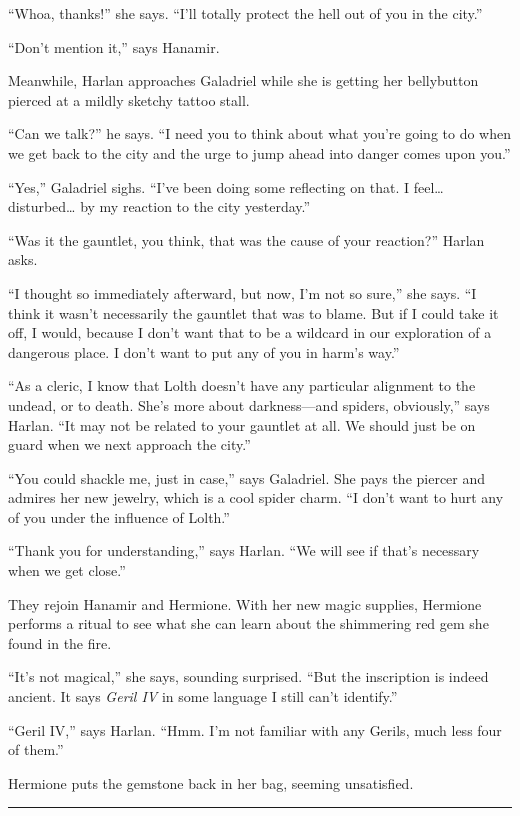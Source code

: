 \documentclass[smalldemyvopaper,11pt,twoside,onecolumn,openright,extrafontsizes]{memoir}
\begin{document}
``Whoa, thanks!'' she says. ``I'll totally protect the hell out of you
in the city.''

``Don't mention it,'' says Hanamir.

Meanwhile, Harlan approaches Galadriel while she is getting her
bellybutton pierced at a mildly sketchy tattoo stall.

``Can we talk?'' he says. ``I need you to think about what you're going
to do when we get back to the city and the urge to jump ahead into
danger comes upon you.''

``Yes,'' Galadriel sighs. ``I've been doing some reflecting on that. I
feel\ldots{} disturbed\ldots{} by my reaction to the city yesterday.''

``Was it the gauntlet, you think, that was the cause of your reaction?''
Harlan asks.

``I thought so immediately afterward, but now, I'm not so sure,'' she
says. ``I think it wasn't necessarily the gauntlet that was to blame.
But if I could take it off, I would, because I don't want that to be a
wildcard in our exploration of a dangerous place. I don't want to put
any of you in harm's way.''

``As a cleric, I know that Lolth doesn't have any particular alignment
to the undead, or to death. She's more about darkness---and spiders,
obviously,'' says Harlan. ``It may not be related to your gauntlet at
all. We should just be on guard when we next approach the city.''

``You could shackle me, just in case,'' says Galadriel. She pays the
piercer and admires her new jewelry, which is a cool spider charm. ``I
don't want to hurt any of you under the influence of Lolth.''

``Thank you for understanding,'' says Harlan. ``We will see if that's
necessary when we get close.''

They rejoin Hanamir and Hermione. With her new magic supplies, Hermione
performs a ritual to see what she can learn about the shimmering red gem
she found in the fire.

``It's not magical,'' she says, sounding surprised. ``But the
inscription is indeed ancient. It says \emph{Geril IV} in some language
I still can't identify.''

``Geril IV,'' says Harlan. ``Hmm. I'm not familiar with any Gerils, much
less four of them.''

Hermione puts the gemstone back in her bag, seeming unsatisfied.

\begin{center}\rule{0.5\linewidth}{\linethickness}\end{center}
\end{document}
